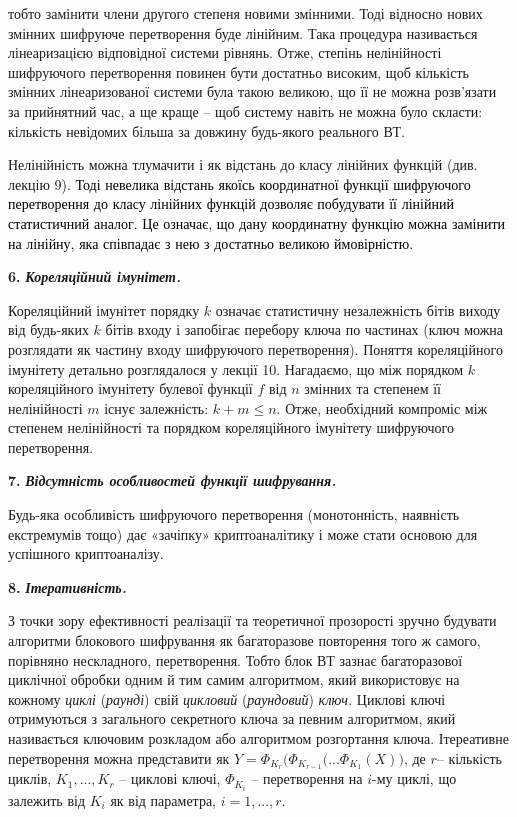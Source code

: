 \documentclass[a4paper]{article}
\newcounter{}
\begin{document}
тобто замінити члени другого степеня новими змінними. Тоді відносно нових
змінних шифруюче перетворення буде лінійним.  Така процедура називається
лінеаризацією відповідної системи рівнянь. Отже, степінь нелінійності
шифруючого перетворення повинен бути достатньо високим, щоб кількість змінних
лінеаризованої системи була такою\textbf{ }великою, що її не можна розв’язати
за прийнятний час, а ще краще –\textbf{ }щоб систему\textbf{ }навіть не можна
було скласти: кількість невідомих більша за довжину будь-якого реального ВТ.

Нелінійність можна тлумачити і як відстань до класу лінійних функцій (див.
лекцію 9\textcolor{black}{). Тоді невелика відстань якоїсь координатної функції
шифруючого перетворення до класу лінійних функцій дозволяє побудувати її
лінійний статистичний аналог. Це означає, що дану координатну функцію можна
замінити на лінійну, яка співпадає з нею з достатньо великою ймовірністю.}

\textbf{6.}\textit{  }\textbf{\textit{ Кореляційний імунітет.}}

Кореляційний імунітет порядку  ${k}$ означає статистичну незалежність бітів
виходу від будь-яких  ${k}$ бітів входу і запобігає перебору ключа по частинах
(ключ можна розглядати як частину входу шифруючого перетворення). Поняття
кореляційного імунітету детально розглядалося у лекції 10. Нагадаємо, що між
порядком  ${k}$ кореляційного імунітету булевої функції  ${f}$ від  ${n}$
змінних та степенем її нелінійності  ${m}$ існує залежність:  ${k+m\le n}$.
Отже,  необхідний компроміс між степенем нелінійності та порядком кореляційного
імунітету шифруючого перетворення.


\bigskip

\textbf{7.}\textit{  }\textbf{\textit{Відсутність особливостей функції
шифрування.}}

Будь-яка особливість шифруючого перетворення (монотонність, наявність
екстремумів тощо) дає «зачіпку» криптоаналітику і може стати основою для
успішного криптоаналізу.


\bigskip

\textbf{8.}\textit{ }\textbf{\textit{ Ітеративність.}}

З точки зору ефективності реалізації та теоретичної прозорості зручно будувати
алгоритми блокового шифрування як багаторазове повторення того ж самого,
порівняно нескладного, перетворення. Тобто блок ВТ зазнає багаторазової
циклічної обробки одним й тим самим алгоритмом, який використовує на кожному
\textit{циклі} (\textit{раунді}) свій \textit{цикловий }(\textit{раундовий})
\textit{ключ.} Циклові ключі отримуються з загального секретного ключа за
певним алгоритмом, який називається ключовим розкладом або алгоритмом
розгортання ключа. Ітереативне перетворення можна представити як   ${Y=\Phi
_{{K_{{r}}}}(\Phi _{K_{{r-1}}}{(\text{.}\text{.}\text{.}\Phi
_{K_{{1}}}}{(X))}}$, де  ${r}$– кількість циклів, 
${K_{{1}},\text{.}\text{.}\text{.},K_{{r}}}$ – циклові ключі,  ${\Phi
_{{K_{{i}}}}}$ $ $– перетворення на  ${i}${}-му циклі,  що залежить від 
${K_{{i}}}$ як від параметра,  ${i=1,\text{.}\text{.}\text{.},r}$.
\end{document}
